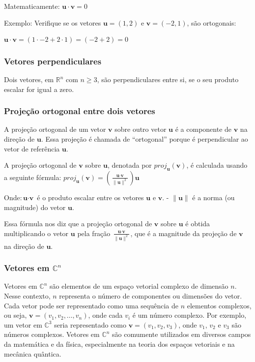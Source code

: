 \documentclass[12pt]{article}
\begin{document}
Matematicamente: \(\textbf{u}  \cdot  \textbf{v} = 0\)

Exemplo: Verifique se os vetores \(\textbf{u} = (1, 2)\) e \(\textbf{v} = (-2, 1)\), são ortogonais:

\(\textbf{u}  \cdot  \textbf{v} = (1  \cdot  -2 + 2  \cdot  1) = (-2 + 2) = 0\)


\subsubsection{Vetores perpendiculares}

Dois vetores, em \(\mathbb{R}^n\) com \(\textit{n} \geq 3\), são perpendiculares entre si, se o seu produto escalar for igual a zero.

\subsubsection{Projeção ortogonal entre dois vetores}

A projeção ortogonal de um vetor \(\textbf{v}\) sobre outro vetor \(\textbf{u}\) é a componente de \(\textbf{v}\) na direção de \(\textbf{u}\). Essa projeção é chamada de \enquote{ortogonal} porque é perpendicular ao vetor de referência \(\textbf{u}\).

A projeção ortogonal de \(\textbf{v}\) sobre \(\textbf{u}\), denotada por \(proj_{\textbf{u}}(\textbf{v})\), é calculada usando a seguinte fórmula: \(proj_{\textbf{u}}(\textbf{v}) = \left( \frac{\textbf{u} \cdot \textbf{v}}{\|\textbf{u}\|^2} \right) \textbf{u}\)


Onde:\(\textbf{u}  \cdot  \textbf{v} \) é o produto escalar entre os vetores \( \textbf{u} \) e \( \textbf{v} \).
- \( \| \textbf{u} \| \) é a norma (ou magnitude) do vetor \( \textbf{u} \).

Essa fórmula nos diz que a projeção ortogonal de \( \textbf{v} \) sobre \( \textbf{u} \) é obtida multiplicando o vetor \( \textbf{u} \) pela fração \(\frac{\textbf{u} \cdot \textbf{v}}{\|\textbf{u}\|^2}\), que é a magnitude da projeção de \(\textbf{v} \) na direção de \(\textbf{u}\).

\subsubsection{Vetores em $\mathbb{C}^n$}

Vetores em $\mathbb{C}^n$ são elementos de um espaço vetorial complexo de dimensão $n$. Nesse contexto, $n$ representa o número de componentes ou dimensões do vetor. Cada vetor pode ser representado como uma sequência de $n$ elementos complexos, ou seja, $\textbf{v} = (v_1, v_2, \ldots, v_n)$, onde cada $v_i$ é um número complexo. Por exemplo, um vetor em $\mathbb{C}^3$ seria representado como $\textbf{v} = (v_1, v_2, v_3)$, onde $v_1$, $v_2$ e $v_3$ são números complexos. Vetores em $\mathbb{C}^n$ são comumente utilizados em diversos campos da matemática e da física, especialmente na teoria dos espaços vetoriais e na mecânica quântica.
\end{document}
